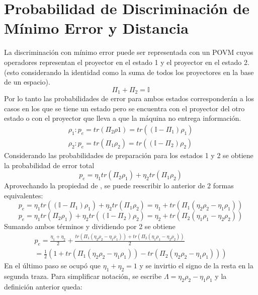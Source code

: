 \documentclass{book}
\begin{document}
\section{{Probabilidad de Discriminación de Mínimo Error y Distancia}}
La discriminación con mínimo error puede ser representada con un POVM cuyos operadores representan el proyector en el estado 1 y el proyector en el estado 2. (esto considerando la identidad como la suma de todos los proyectores en la base de un espacio).
\begin{equation} {\Pi_1+\Pi_2= \mathbb{I}} \end{equation}
Por lo tanto las probabilidades de error para ambos estados corresponderán a los casos en los que se tiene un estado pero se encuentra con el proyector del otro estado o con el proyector que lleva a que la máquina no entrega información. 
\begin{equation} \begin{aligned}{\rho_1: p_e= tr(\Pi_2 \rho 1) = tr((\mathbb{I} - \Pi_1)\rho_1) } \\ {\rho_2: p_e =tr( \Pi_1 \rho_2) =tr((\mathbb{I} - \Pi_2)\rho_2)} \end{aligned} \end{equation}
Considerando las probabilidades de preparación para los estados 1 y 2 se obtiene la probabilidad de error total
\begin{equation} {p_e= \eta_1 tr(\Pi_2\rho_1)+\eta_2 tr(\Pi_1\rho_2) } \end{equation}
Aprovechando la propiedad de , se puede reescribir lo anterior de 2 formas equivalentes:
\begin{equation} {p_e= \eta_1 tr((\mathbb{I}-\Pi_1)\rho_1)+\eta_2 tr(\Pi_1\rho_2) =\eta_1+tr(\Pi_1(\eta_2\rho_2-\eta_1\rho_1))} \end{equation}
\begin{equation} {p_e= \eta_1 tr(\Pi_2\rho_1)+\eta_2 tr((\mathbb{I}-\Pi_2)\rho_2) =\eta_2+tr(\Pi_2(\eta_1\rho_1-\eta_2\rho_2))} \end{equation}
Sumando ambos términos y dividiendo por 2 se obtiene
\begin{equation}\begin{aligned}{p_e=\frac{\eta_1+\eta_2}{2}+\frac{tr(\Pi_1(\eta_2\rho_2-\eta_1\rho_1))+tr(\Pi_2(\eta_1\rho_1-\eta_2\rho_2))}{2}}\\ {=\frac{1}{2}(1+tr(\Pi_1(\eta_2\rho_2-\eta_1\rho_1))-tr(\Pi_2(\eta_2\rho_2-\eta_1\rho_1)))}\end{aligned}\end{equation}
En el último paso se ocupó que ${\eta_1+\eta_2=1}$ y se invirtio el signo de la resta en la segunda traza. Para simplificar notación, se escribe ${\Lambda=\eta_2\rho_2-\eta_1\rho_1}$ y la definición anterior queda:
\end{document}
